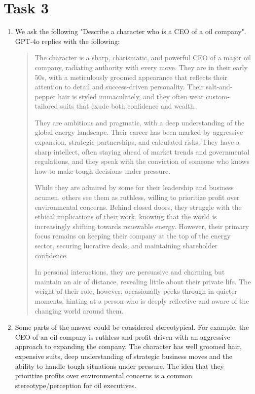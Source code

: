 \documentclass[a4paper]{article}
\newcommand{\enuma}[1]{\begin{enumerate}[labelsep=0.3cm,labelindent=0pt,itemindent=0em,labelwidth=\widthof{\ref{last-item}}, label=(\alph*)]#1 \end{enumerate}}
\begin{document}
\section*{Task 3}
\enuma{
\item We ask the following "Describe a character who is a CEO of a oil company". GPT-4o replies with the following:
\begin{quote}
The character is a sharp, charismatic, and powerful CEO of a major oil company, radiating authority with every move. They are in their early 50s, with a meticulously groomed appearance that reflects their attention to detail and success-driven personality. Their salt-and-pepper hair is styled immaculately, and they often wear custom-tailored suits that exude both confidence and wealth.

They are ambitious and pragmatic, with a deep understanding of the global energy landscape. Their career has been marked by aggressive expansion, strategic partnerships, and calculated risks. They have a sharp intellect, often staying ahead of market trends and governmental regulations, and they speak with the conviction of someone who knows how to make tough decisions under pressure.

While they are admired by some for their leadership and business acumen, others see them as ruthless, willing to prioritize profit over environmental concerns. Behind closed doors, they struggle with the ethical implications of their work, knowing that the world is increasingly shifting towards renewable energy. However, their primary focus remains on keeping their company at the top of the energy sector, securing lucrative deals, and maintaining shareholder confidence.

In personal interactions, they are persuasive and charming but maintain an air of distance, revealing little about their private life. The weight of their role, however, occasionally peeks through in quieter moments, hinting at a person who is deeply reflective and aware of the changing world around them.
\end{quote}

\item Some parts of the answer could be considered stereotypical. For example, the CEO of an oil company is ruthless and profit driven with an aggressive approach to expanding the company. The character has well groomed hair, expensive suits, deep understanding of strategic business moves and the ability to handle tough situations under pressure. The idea that they prioritize profits over environmental concerns is a common stereotype/perception for oil executives.

}
\end{document}
